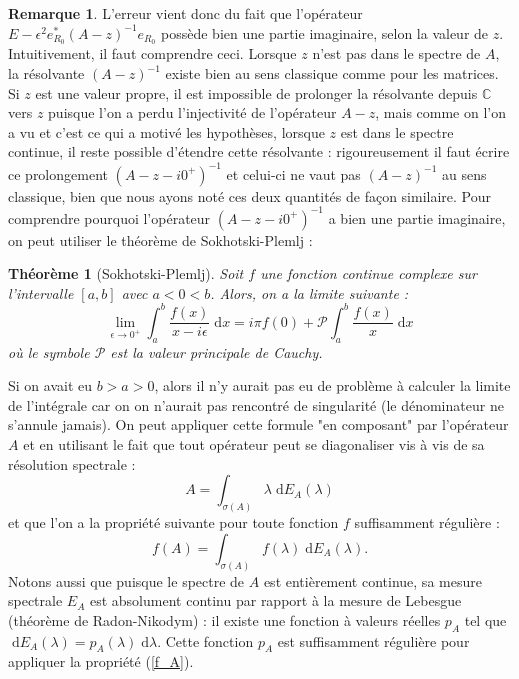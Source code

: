 \documentclass[12pt,openany,a4paper, titlepage]{article}
\newcommand{\f}[2]{\frac{#1}{#2}}
\newcommand{\dd}{\;\mathrm{d}}
\newcommand{\C}{\mathbb{C}}
\newtheorem{theo}{Théorème}
\theoremstyle{definition}
\theoremstyle{definition}
\theoremstyle{definition}
\theoremstyle{definition}
\theoremstyle{definition}
\newtheorem{rem}{Remarque}
\theoremstyle{definition}
\begin{document}
\begin{rem}
L'erreur vient donc du fait que l'opérateur $E - \epsilon^2e_{R_0}^*(A-z)^{-1}e_{R_0}$ possède bien une partie imaginaire, selon la valeur de $z$. Intuitivement, il faut comprendre ceci. Lorsque $z$ n'est pas dans le spectre de $A$, la résolvante $(A-z)^{-1}$ existe bien au sens classique comme pour les matrices. Si $z$ est une valeur propre, il est impossible de prolonger la résolvante depuis $\C$ vers $z$ puisque l'on a perdu l'injectivité de l'opérateur $A-z$, mais comme on l'on a vu et c'est ce qui a motivé les hypothèses, lorsque $z$ est dans le spectre continue, il reste possible d'étendre cette résolvante : rigoureusement il faut écrire ce prolongement $(A-z - i0^+)^{-1}$ et celui-ci ne vaut pas $(A-z)^{-1}$ au sens classique, bien que nous ayons noté ces deux quantités de façon similaire. Pour comprendre pourquoi l'opérateur $(A-z - i0^+)^{-1}$ a bien une partie imaginaire, on peut utiliser le théorème de Sokhotski-Plemlj :
\begin{theo}[Sokhotski-Plemlj]
    Soit $f$ une fonction continue complexe sur l'intervalle $[a,b]$ avec $a<0<b$. Alors, on a la limite suivante :
    \begin{equation}
        \lim\limits_{\epsilon \rightarrow 0^+} \int_a^b \f{f(x)}{x - i\epsilon} \dd x = i\pi f(0) + \mathcal{P} \int_a^b\f{f(x)}{x} \dd{x}
    \end{equation}
    où le symbole $\mathcal{P}$ est la valeur principale de Cauchy.
\end{theo}
Si on avait eu $b>a>0$, alors il n'y aurait pas eu de problème à calculer la limite de l'intégrale car on on n'aurait pas rencontré de singularité (le dénominateur ne s'annule jamais). On peut appliquer cette formule "en composant" par l'opérateur $A$ et en utilisant le fait que tout opérateur peut se diagonaliser vis à vis de sa résolution spectrale :
\begin{equation}
    A = \int_{\sigma(A)} \lambda \dd E_A(\lambda)
\end{equation}
et que l'on a la propriété suivante pour toute fonction $f$ suffisamment régulière :
\begin{equation}\label{f_A}
    f(A) = \int_{\sigma(A)} f(\lambda) \dd E_A(\lambda). 
\end{equation}
 Notons aussi que puisque le spectre de $A$ est entièrement continue, sa mesure spectrale $E_A$ est absolument continu par rapport à la mesure de Lebesgue (théorème de Radon-Nikodym) : il existe une fonction à valeurs réelles $p_A$ tel que $\dd E_A(\lambda) = p_A(\lambda) \dd \lambda$. Cette fonction $p_A$ est suffisamment régulière pour appliquer la propriété (\ref{f_A}).


\end{rem}
\end{document}
